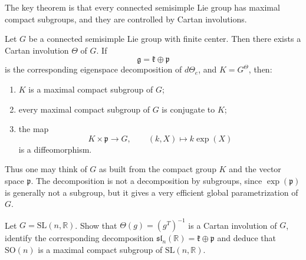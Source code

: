 \documentclass[12pt]{article}
\begin{document}
The key theorem is that every connected semisimple Lie group has maximal compact subgroups, and they are controlled by Cartan involutions.

\begin{theorem}
    Let $G$ be a connected semisimple Lie group with finite center. Then there exists a Cartan involution $\Theta$ of $G$. If
    \[
        \mathfrak g = \mathfrak k \oplus \mathfrak p
    \]
    is the corresponding eigenspace decomposition of $d\Theta_e$, and $K = G^\Theta$, then:
    \begin{enumerate}
        \item $K$ is a maximal compact subgroup of $G$;
        \item every maximal compact subgroup of $G$ is conjugate to $K$;
        \item the map
              \[
                  K \times \mathfrak p \to G,
                  \qquad
                  (k,X) \mapsto k\exp(X)
              \]
              is a diffeomorphism.
    \end{enumerate}
\end{theorem}

Thus one may think of $G$ as built from the compact group $K$ and the vector space $\mathfrak p$. The decomposition is not a decomposition by subgroups, since $\exp(\mathfrak p)$ is generally not a subgroup, but it gives a very efficient global parametrization of $G$.

\begin{exercise}
    Let $G = \mathrm{SL}(n,\mathbb R)$. Show that $\Theta(g) = (g^T)^{-1}$
    is a Cartan involution of $G$, identify the corresponding decomposition $\mathfrak{sl}_n(\mathbb R) = \mathfrak k \oplus \mathfrak p$
    and deduce that $\mathrm{SO}(n)$ is a maximal compact subgroup of $\mathrm{SL}(n,\mathbb R)$.
\end{exercise}
\end{document}
